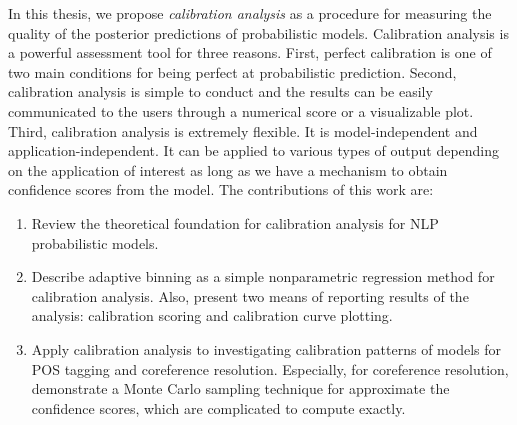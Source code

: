 In this thesis, we propose \textit{calibration analysis} as a procedure for measuring the quality of the posterior predictions of probabilistic models. Calibration analysis is a powerful assessment tool for three reasons. First, perfect calibration is one of two main conditions for being perfect at probabilistic prediction. Second, calibration analysis is simple to conduct and the results can be easily communicated to the users through a numerical score or a visualizable plot. Third, calibration analysis is extremely flexible. It is model-independent and application-independent. It can be applied to various types of output depending on the application of interest as long as we have a mechanism to obtain confidence scores from the model. The contributions of this work are: 

\begin{enumerate}
  \item Review the theoretical foundation for calibration analysis for NLP probabilistic models.
  \item Describe adaptive binning as a simple nonparametric regression method for calibration analysis. Also, present two means of reporting results of the analysis: calibration scoring and calibration curve plotting.
  \item Apply calibration analysis to investigating calibration patterns of models for POS tagging and coreference resolution. Especially, for coreference resolution, demonstrate a Monte Carlo sampling technique for approximate the confidence scores, which are complicated to compute exactly.   
\end{enumerate}


